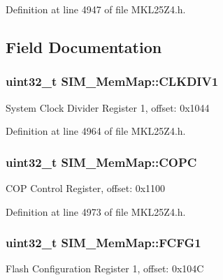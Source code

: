 Definition at line 4947 of file M\+K\+L25\+Z4.\+h.



\subsection{Field Documentation}
\subsubsection[{\texorpdfstring{C\+L\+K\+D\+I\+V1}{CLKDIV1}}]{\setlength{\rightskip}{0pt plus 5cm}uint32\+\_\+t S\+I\+M\+\_\+\+Mem\+Map\+::\+C\+L\+K\+D\+I\+V1}\hypertarget{struct_s_i_m___mem_map_afa315c39ebd4ef380b7f8d67a88d4f82}{}\label{struct_s_i_m___mem_map_afa315c39ebd4ef380b7f8d67a88d4f82}
System Clock Divider Register 1, offset\+: 0x1044 

Definition at line 4964 of file M\+K\+L25\+Z4.\+h.

\subsubsection[{\texorpdfstring{C\+O\+PC}{COPC}}]{\setlength{\rightskip}{0pt plus 5cm}uint32\+\_\+t S\+I\+M\+\_\+\+Mem\+Map\+::\+C\+O\+PC}\hypertarget{struct_s_i_m___mem_map_adb743819184b25914372606a57d6e416}{}\label{struct_s_i_m___mem_map_adb743819184b25914372606a57d6e416}
C\+OP Control Register, offset\+: 0x1100 

Definition at line 4973 of file M\+K\+L25\+Z4.\+h.

\subsubsection[{\texorpdfstring{F\+C\+F\+G1}{FCFG1}}]{\setlength{\rightskip}{0pt plus 5cm}uint32\+\_\+t S\+I\+M\+\_\+\+Mem\+Map\+::\+F\+C\+F\+G1}\hypertarget{struct_s_i_m___mem_map_a2b78edd16e6d046eb3399182216bf816}{}\label{struct_s_i_m___mem_map_a2b78edd16e6d046eb3399182216bf816}
Flash Configuration Register 1, offset\+: 0x104C 

